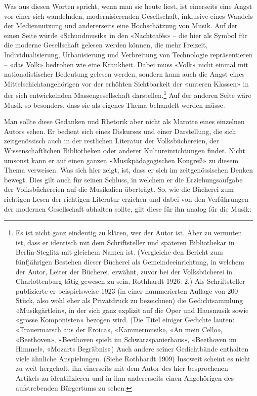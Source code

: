 \documentclass[a4paper,
fontsize=11pt,
oneside,
numbers=noperiodatend,
parskip=half-,
bibliography=totoc,
final
]{scrartcl}
\begin{document}
Was aus diesen Worten spricht, wenn man sie heute liest, ist einerseits
eine Angst vor einer sich wandelnden, modernisierenden Gesellschaft,
inklusive eines Wandels der Mediennutzung und andererseits eine
Hochschätzung von Musik. Auf der einen Seite würde «Schundmusik» in den
«Nachtcafés» -- die hier als Symbol für die moderne Gesellschaft gelesen
werden können, die mehr Freizeit, Individualisierung, Urbanisierung und
Verbreitung von Technologie repräsentieren -- «das Volk» bedrohen wie
eine Krankheit. Dabei muss «Volk» nicht einmal mit nationalistischer
Bedeutung gelesen werden, sondern kann auch die Angst eines
Mittelschichtangehörigen vor der erhöhten Sichtbarkeit der «unteren
Klassen» in der sich entwickelnden Massengesellschaft
darstellen.\footnote{Es ist nicht ganz eindeutig zu klären, wer der
  Autor ist. Aber zu vermuten ist, dass er identisch mit dem
  Schriftsteller und späteren Bibliothekar in Berlin-Steglitz mit
  gleichem Namen ist. (Vergleiche den Bericht zum fünfjährigen Bestehen
  dieser Bücherei als Gemeindeeinrichtung, in welchem der Autor, Leiter
  der Bücherei, erwähnt, zuvor bei der Volksbücherei in Charlottenburg
  tätig gewesen zu sein, Rothhardt 1926: 2.) Als Schriftsteller
  publizierte er beispielsweise 1923 (in einer nummerierten Auflage von
  200 Stück, also wohl eher als Privatdruck zu bezeichnen) die
  Gedichtsammlung «Musikgärtlein», in der sich ganz explizit auf die
  Oper und Hausmusik sowie «grosse Komponisten» bezogen wird. (Die Titel
  einiger Gedichte lauten: «Trauermarsch aus der Eroica», «Kammermusik»,
  «An mein Cello», «Beethoven», «Beethoven spielt im
  Schwarzspanierhaus», «Beethoven im Himmel», «Mozarts Begräbnis») Auch
  andere seiner Gedichtbände enthalten viele ähnliche Anspielungen.
  (Siehe Rothhardt 1909) Insoweit scheint es nicht zu weit hergeholt,
  ihn einerseits mit dem Autor des hier besprochenen Artikels zu
  identifizieren und in ihm andererseits einen Angehörigen des
  aufstrebenden Bürgertums zu sehen.} Auf der anderen Seite wäre Musik
so besonders, dass sie als eigenes Thema behandelt werden müsse.

Man sollte diese Gedanken und Rhetorik aber nicht als Marotte eines
einzelnen Autors sehen. Er bedient sich eines Diskurses und einer
Darstellung, die sich zeitgenössisch auch in der restlichen Literatur
der Volksbüchereien, der Wissenschaftlichen Bibliotheken oder anderer
Kultureinrichtungen findet. Nicht umsonst kann er auf einen ganzen
«Musikpädagogischen Kongreß» zu diesem Thema verweisen. Was sich hier
zeigt, ist, dass er sich im zeitgenössischen Denken bewegt. Dies gilt
auch für seinen Schluss, in welchem er die Erziehungsaufgabe der
Volksbüchereien auf die Musikalien überträgt. So, wie die Bücherei zum
richtigen Lesen der richtigen Literatur erziehen und dabei von den
Verführungen der modernen Gesellschaft abhalten sollte, gilt diese für
ihn analog für die Musik:
\end{document}
